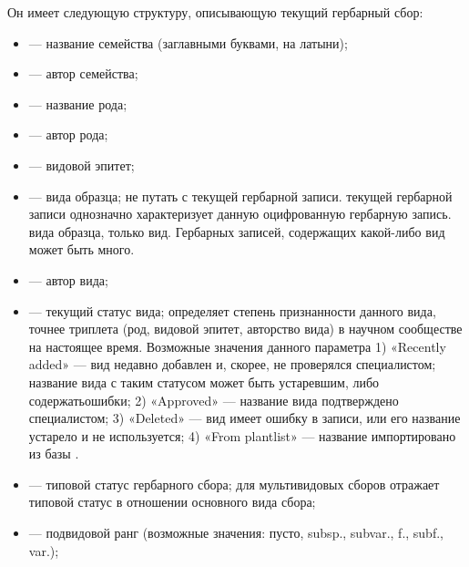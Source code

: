 \documentclass[letterpaper,10pt,russian]{sphinxmanual}
\begin{document}
Он имеет следующую структуру, описывающую текущий гербарный сбор:
\begin{itemize}
\item {} 
 — название семейства (заглавными буквами, на латыни);

\item {} 
 — автор семейства;

\item {} 
 — название рода;

\item {} 
 — автор рода;

\item {} 
 — видовой эпитет;

\item {} 
 —  вида образца; не путать с  текущей гербарной записи.  текущей гербарной записи однозначно характеризует данную оцифрованную гербарную запись.  вида образца, только вид. Гербарных записей, содержащих какой-либо вид может быть много.

\item {} 
 — автор вида;

\item {} 
 — текущий статус вида; определяет степень признанности данного вида, точнее триплета (род, видовой эпитет, авторство вида) в научном сообществе на настоящее время. Возможные значения данного параметра 1) «Recently added» — вид недавно добавлен и, скорее, не проверялся специалистом; название вида с таким статусом может быть устаревшим, либо содержатьошибки; 2) «Approved» — название вида подтверждено специалистом; 3) «Deleted» — вид имеет ошибку в записи, или его название устарело и не используется; 4) «From plantlist» — название импортировано из базы .

\item {} 
 — типовой статус гербарного сбора; для мультивидовых сборов \textendash{} отражает типовой статус в отношении основного вида сбора;

\item {} 
 — подвидовой ранг (возможные значения: пусто, subsp., subvar., f., subf., var.);


\end{itemize}
\end{document}

